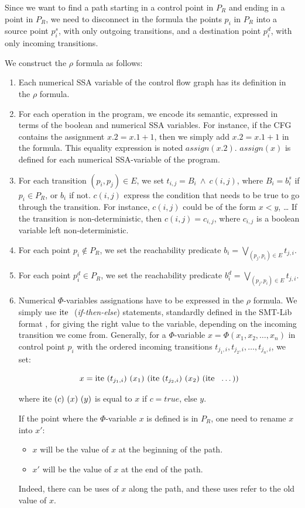 \documentclass[a4paper,english,titlepage,11pt]{article}
\def\ite{\textnormal{ite\ }}
\begin{document}
	Since we want to find a path starting in a control point in $P_R$ and ending
	in a point in $P_R$, we need to disconnect in the formula the points $p_i$
	in $P_R$ into a source point $p_i^s$, with only outgoing transitions, and a
	destination point $p_i^d$, with only incoming transitions. 

	We construct the $\rho$ formula as follows:

\begin{enumerate}
\item Each numerical SSA variable of the control flow graph has its definition
in the $\rho$ formula.
\item For each operation in the program, we encode its semantic, expressed in
terms of the boolean and numerical SSA variables. For instance, if the CFG
contains the assignment $x.2 = x.1 + 1$, then we simply add $x.2 = x.1 + 1$ in
the formula. This equality expression is noted $assign(x.2)$. 
$assign(x)$ is defined for each numerical SSA-variable of the program.
\item For each transition $(p_i,p_j) \in E$, we set $t_{i,j} = B_i\ \wedge \
c(i,j)$, where $B_i = b_i^s$ if $p_i \in P_R$, or $b_i$ if not.
$c(i,j)$ express the condition that needs to be true to go through the
transition. For instance, $c(i,j)$ could be of the form $x < y$, \dots
If the transition is non-deterministic, then $c(i,j) = c_{i,j}$, where
$c_{i,j}$ is a boolean variable left non-deterministic.
\item For each point $p_i \notin P_R$, we set the reachability predicate 
$b_i = \displaystyle \bigvee_{(p_j,p_i)\in E} t_{j,i}$.
\item For each point $p_i^d \in P_R$, we set the reachability predicate 
$b_i^d = \displaystyle \bigvee_{(p_j,p_i)\in E} t_{j,i}$. 
\item Numerical $\Phi$-variables assignations have to be expressed in the $\rho$
formula. We simply use $\ite$ (\emph{if-then-else}) statements, standardly defined in the
SMT-Lib format \cite{BarST-SMTLIB}, for giving the right value to the variable,
depending on the incoming transition we come from. Generally, for a
$\Phi$-variable $x = \Phi(x_1,x_2,\dots,x_n)$ in control point $p_i$ with the
ordered incoming transitions $t_{j_1,i},t_{j_2,i},\dots,t_{j_n,i}$, we set:

$$x = \ite (t_{j_1,i})\  (x_1)\  (\ite (t_{j_2,i})\  (x_2)\  (\ite\  \dots))$$

where $\ite (c)\ (x)\ (y)$ is equal to $x$ if $c = true$, else $y$.

If the point where the $\Phi$-variable $x$ is defined is in
$P_R$, one need to rename $x$ into $x'$:
\begin{itemize}
\item $x$ will be the value of $x$ at the beginning of the path.
\item $x'$ will be the value of $x$ at the end of the path.
\end{itemize}
Indeed, there can be uses of $x$ along the path, and these uses refer to the
old value of $x$. 
\end{enumerate}
\end{document}

